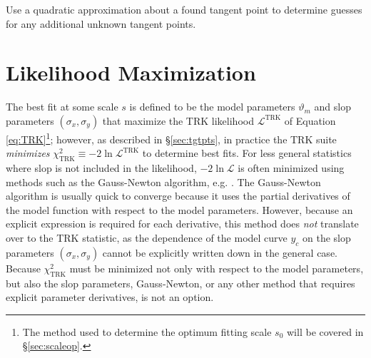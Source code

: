 \begin{algorithm}
\label{algo:quadapprox}
\caption{Use a quadratic approximation about a found tangent point to determine guesses for any additional unknown tangent points.}
\DontPrintSemicolon
\end{algorithm}

\section{Likelihood Maximization}
\label{sec:simplex}

The best fit at some scale $s$ is defined to be the model parameters $\vartheta_m$ and slop parameters $(\sigma_x,\sigma_y)$ that maximize the TRK likelihood $\mathcal{L}^\text{TRK}$ of Equation \eqref{eq:TRK}\footnote{The method used to determine the optimum fitting scale $s_0$ will be covered in \S\ref{sec:scaleop}.}; however, as described in \S\ref{sec:tgtpts}, in practice the TRK suite \textit{minimizes} $\chi^2_\text{TRK}\equiv-2\ln \mathcal{L}^\text{TRK}$ to determine best fits. For less general statistics where slop is not included in the likelihood, $-2\ln\mathcal{L}$ is often minimized using methods such as the Gauss-Newton algorithm, e.g. \textcite{maples2018robust}. The Gauss-Newton algorithm is usually quick to converge because it uses the partial derivatives of the model function with respect to the model parameters. However, because an explicit expression is required for each derivative, this method does \textit{not} translate over to the TRK statistic, as the dependence of the model curve $y_c$ on the slop parameters $(\sigma_x, \sigma_y)$ cannot be explicitly written down in the general case. Because $\chi^2_\text{TRK}$ must be minimized not only with respect to the model parameters, but also the slop parameters, Gauss-Newton, or any other method that requires explicit parameter derivatives, is not an option. 

